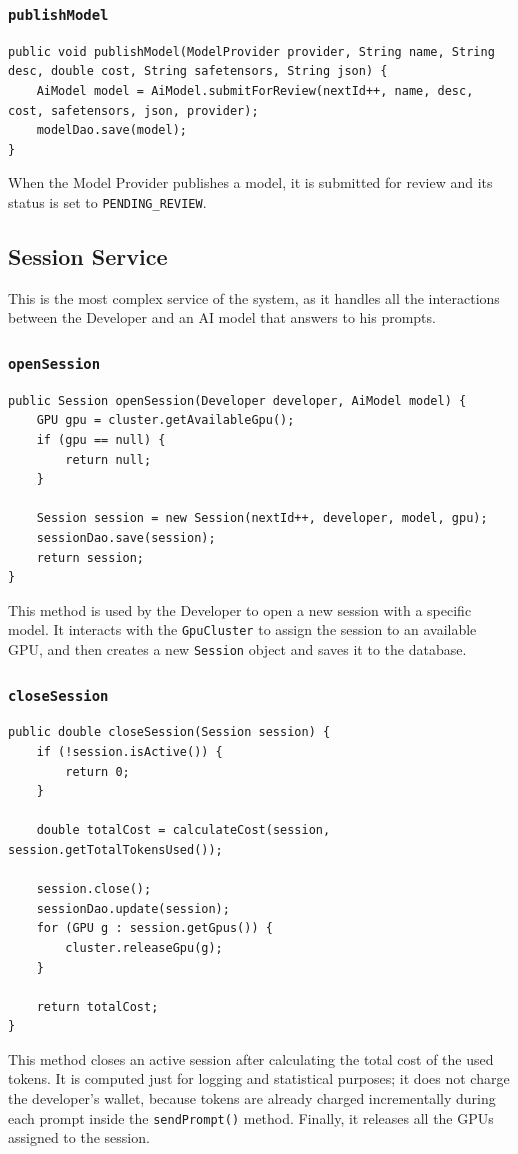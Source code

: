 \documentclass[a4paper,11pt]{report}
\begin{document}
\subsubsection{\texttt{publishModel}}
\begin{lstlisting}[label={lst:publishmodel}]
public void publishModel(ModelProvider provider, String name, String desc, double cost, String safetensors, String json) {
    AiModel model = AiModel.submitForReview(nextId++, name, desc, cost, safetensors, json, provider);
    modelDao.save(model);
}
\end{lstlisting}

When the Model Provider publishes a model, it is submitted for review and its status is set to \texttt{PENDING\_REVIEW}. 

\subsection{Session Service}
\label{subsec:SessionService}
This is the most complex service of the system, as it handles all the interactions between the Developer and an AI model that answers to his prompts.

\subsubsection{\texttt{openSession}}
\begin{lstlisting}[label={lst:opensession}]
public Session openSession(Developer developer, AiModel model) {
    GPU gpu = cluster.getAvailableGpu();
    if (gpu == null) {
        return null;
    }

    Session session = new Session(nextId++, developer, model, gpu);
    sessionDao.save(session);
    return session;
}
\end{lstlisting}

This method is used by the Developer to open a new session with a specific model. It interacts with the \texttt{GpuCluster} to assign the session to an available GPU, and then creates a new \texttt{Session} object and saves it to the database.

\subsubsection{\texttt{closeSession}}
\begin{lstlisting}[label={lst:closesession}]
public double closeSession(Session session) {
    if (!session.isActive()) {
        return 0;
    }

    double totalCost = calculateCost(session, session.getTotalTokensUsed());

    session.close();
    sessionDao.update(session);
    for (GPU g : session.getGpus()) {
        cluster.releaseGpu(g);
    }

    return totalCost;
}
\end{lstlisting}
This method closes an active session after calculating the total cost of the used tokens. It is computed just for logging and statistical purposes; it does not charge the developer's wallet, because tokens are already charged incrementally during each prompt inside the \texttt{sendPrompt()} method. Finally, it releases all the GPUs assigned to the session.
\end{document}
